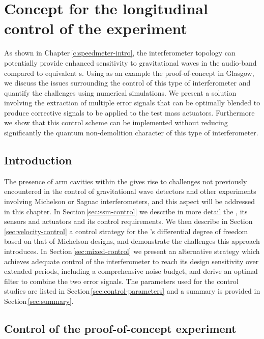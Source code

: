 \chapter{\label{c:speedmeter-control}Concept for the longitudinal control of the \SSM{} experiment}

\newcommand{\RT}{$\textrm{R}_{\textrm{T}}$}

As shown in Chapter\,\ref{c:speedmeter-intro}, the \SSM{} interferometer topology can potentially provide enhanced sensitivity to gravitational waves in the audio-band compared to equivalent \MI{}s. Using as an example the proof-of-concept \SSMEXPT{} in Glasgow, we discuss the issues surrounding the control of this type of interferometer and quantify the challenges using numerical simulations. We present a solution involving the extraction of multiple error signals that can be optimally blended to produce corrective signals to be applied to the test mass actuators. Furthermore we show that this control scheme can be implemented without reducing significantly the quantum non-demolition character of this type of interferometer.

\section{Introduction}
The presence of arm cavities within the \SSMEXPT{} gives rise to challenges not previously encountered in the control of gravitational wave detectors and other experiments involving Michelson or Sagnac interferometers, and this aspect will be addressed in this chapter. In Section\,\ref{sec:ssm-control} we describe in more detail the \SSMEXPT{}, its sensors and actuators and its control requirements. We then describe in Section\,\ref{sec:velocity-control} a control strategy for the \SSM{}'s differential degree of freedom based on that of Michelson designs, and demonstrate the challenges this approach introduces. In Section\,\ref{sec:mixed-control} we present an alternative strategy which achieves adequate control of the interferometer to reach its design sensitivity over extended periods, including a comprehensive noise budget, and derive an optimal filter to combine the two error signals. The parameters used for the control studies are listed in Section\,\ref{sec:control-parameters} and a summary is provided in Section\,\ref{sec:summary}.

\section{\label{sec:ssm-control}Control of the proof-of-concept experiment}

